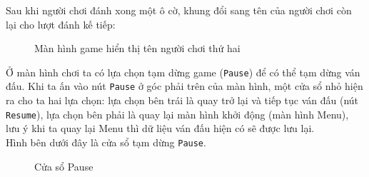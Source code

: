 Sau khi người chơi đánh xong một ô cờ, khung đổi sang tên của người chơi còn lại cho lượt đánh kế tiếp:
\begin{figure}[H]
\caption{Màn hình game hiển thị tên người chơi thứ hai}
\end{figure}

Ở màn hình chơi ta có lựa chọn tạm dừng game (\verb|Pause|) để có thể tạm dừng ván đấu. Khi ta ấn vào nút \verb|Pause| ở góc phải trên của màn hình, một cửa sổ nhỏ hiện ra cho ta hai lựa chọn: lựa chọn bên trái là quay trở lại và tiếp tục ván đấu (nút \verb|Resume|), lựa chọn bên phải là quay lại màn hình khởi động (màn hình Menu), lưu ý khi ta quay lại Menu thì dữ liệu ván đấu hiện có sẽ được lưu lại. \\
Hình bên dưới đây là cửa sổ tạm dừng \verb|Pause|.
\begin{figure}[H]
  \caption{Cửa sổ Pause}
\end{figure}
